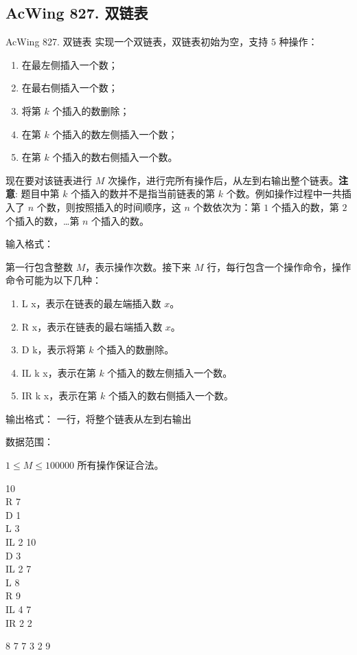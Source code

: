 \subsection{AcWing 827. 双链表}
\begin{titledbox}{AcWing 827. 双链表}
实现一个双链表，双链表初始为空，支持 $5$ 种操作：

\begin{enumerate}
    \itemsep=-5pt
    \item 在最左侧插入一个数；
    \item 在最右侧插入一个数；
    \item 将第 $k$ 个插入的数删除；
    \item 在第 $k$ 个插入的数左侧插入一个数；
    \item 在第 $k$ 个插入的数右侧插入一个数。
\end{enumerate}

现在要对该链表进行 $M$ 次操作，进行完所有操作后，从左到右输出整个链表。\textbf{注意}: 题目中第 $k$ 个插入的数并不是指当前链表的第 $k$ 个数。例如操作过程中一共插入了 $n$ 个数，则按照插入的时间顺序，这 $n$ 个数依次为：第 $1$ 个插入的数，第 $2$ 个插入的数，…第 $n$ 个插入的数。

输入格式：

第一行包含整数 $M$，表示操作次数。接下来 $M$ 行，每行包含一个操作命令，操作命令可能为以下几种：

\begin{enumerate}
    \itemsep=-5pt
    \item L x，表示在链表的最左端插入数 $x$。
    \item R x，表示在链表的最右端插入数 $x$。
    \item D k，表示将第 $k$ 个插入的数删除。
    \item IL k x，表示在第 $k$ 个插入的数左侧插入一个数。
    \item IR k x，表示在第 $k$ 个插入的数右侧插入一个数。
\end{enumerate}

输出格式： 
一行，将整个链表从左到右输出

数据范围：

$1 \le M \le 100000$ 所有操作保证合法。

\begin{inputblock}
    10 \\
    R 7 \\
    D 1 \\
    L 3 \\
    IL 2 10 \\
    D 3 \\
    IL 2 7 \\
    L 8 \\
    R 9 \\
    IL 4 7 \\
    IR 2 2
\end{inputblock}
\begin{outputblock}
    8 7 7 3 2 9
\end{outputblock}
\end{titledbox}

